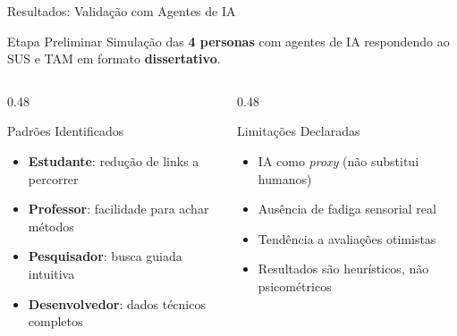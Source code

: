 \documentclass[aspectratio=169]{beamer}
\begin{document}
\begin{frame}{Resultados: Validação com Agentes de IA}
    \begin{block}{Etapa Preliminar}
        Simulação das \textbf{4 personas} com agentes de IA respondendo ao SUS e TAM em formato \textbf{dissertativo}.
    \end{block}

    \vspace{0.10cm}

    \begin{columns}[T]
        \begin{column}{0.48\textwidth}
            \begin{exampleblock}{Padrões Identificados}
                \begin{itemize}\small
                    \item \textbf{Estudante}: redução de links a percorrer
                    \item \textbf{Professor}: facilidade para achar métodos
                    \item \textbf{Pesquisador}: busca guiada intuitiva
                    \item \textbf{Desenvolvedor}: dados técnicos completos
                \end{itemize}
            \end{exampleblock}
        \end{column}
        \begin{column}{0.48\textwidth}
            \begin{alertblock}{Limitações Declaradas}
                \begin{itemize}\small
                    \item IA como \textit{proxy} (não substitui humanos)
                    \item Ausência de fadiga sensorial real
                    \item Tendência a avaliações otimistas
                    \item Resultados são heurísticos, não psicométricos
                \end{itemize}
            \end{alertblock}
        \end{column}
    \end{columns}

\end{frame}
\end{document}
